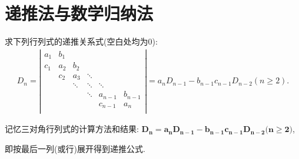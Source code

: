 \documentclass[../../main.tex]{subfiles}
\begin{document}
\section{递推法与数学归纳法}

\begin{proposition}\label{三对角行列式}
求下列行列式的递推关系式(空白处均为0):
\begin{equation}
\begin{split}
D_n=\left| \begin{matrix}
a_1&		b_1&		&		&		&		\\
c_1&		a_2&		b_2&		&		&		\\
&		c_2&		a_3&		\ddots&		&		\\
&		&		\ddots&		\ddots&		\ddots&		\\
&		&		&		\ddots&		a_{n-1}&		b_{n-1}\\
&		&		&		&		c_{n-1}&		a_n\\
\end{matrix} \right|=a_nD_{n-1}-b_{n-1}c_{n-1}D_{n-2}(n\geqslant 2).
\end{split}
\nonumber
\end{equation}
\end{proposition}
\begin{note}
记忆三对角行列式的计算方法和结果:
$\boldsymbol{D}_{\boldsymbol{n}}=\boldsymbol{a}_{\boldsymbol{n}}\boldsymbol{D}_{\boldsymbol{n}-\boldsymbol{1}}-\boldsymbol{b}_{\boldsymbol{n}-\boldsymbol{1}}\boldsymbol{c}_{\boldsymbol{n}-\boldsymbol{1}}\boldsymbol{D}_{\boldsymbol{n}-\boldsymbol{2}}\boldsymbol{(n}\ge \boldsymbol{2)}$,

即按最后一列(或行)展开得到递推公式.
\end{note}
\end{document}
